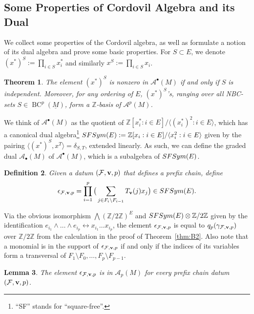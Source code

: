 \documentclass{amsart}
\newtheorem{theorem}{Theorem}[section]
\newtheorem{lemma}[theorem]{Lemma}
\newtheorem{definition}[theorem]{Definition}
\newcommand\Acal{{\mathcal A}}
\newcommand\Fcal{{\mathcal F}}
\newcommand\vv{{\bf v}}
\newcommand\ZZ{{\mathbb Z}}
\newcommand\Ztwo{{\mathbb Z}/2{\mathbb Z}}
\newcommand\qbv{{q}}
\DeclareMathOperator{\BC}{BC}
\begin{document}
{\subsection{Some Properties of Cordovil Algebra and its Dual} \label{sec:Cordovil}

We collect some properties of the Cordovil algebra, as well as formulate a notion of its dual algebra and prove some basic properties. For $S\subset E$, we denote $(x^*)^S:=\prod_{i\in S} x^*_i$ and similarly $x^S:=\prod_{i\in S} x_i$.

\begin{theorem} \cite[Corollary~2.5 and Corollary~2.8]{Cord02}
The element $(x^*)^S$ is nonzero in $\Acal^\bullet(M)$ if and only if $S$ is independent. Moreover, for any ordering of $E$, $(x^*)^S$'s, ranging over all NBC-sets $S\in\BC^p(\underline{M})$, form a $\ZZ$-basis of $\Acal^p(M)$. 
\end{theorem}

We think of $\Acal^\bullet(M)$ as the quotient of $\mathbb{Z}[x_i^*:i\in E]/\langle (x^*_i)^2: i\in E\rangle$, which has a canonical dual algebra\footnote{``SF'' stands for ``square-free''.} ${\rm SFSym}(E):=\mathbb{Z}[x_i:i\in E]/\langle x_i^2: i\in E\rangle$ given by the pairing $\langle(x^*)^S, x^T\rangle=\delta_{S,T}$, extended linearly. As such, we can define the graded dual $\Acal_\bullet(M)$ of $\Acal^\bullet(M)$, which is a subalgebra of ${\rm SFSym}(E)$.

\begin{definition}
    Given a datum $(\Fcal,\vv,p)$ that defines a prefix chain, define
    $$\epsilon_{\Fcal,\vv,p}=\prod_{i=1}^p\big(\sum_{j\in F_i\setminus F_{i-1}} T_\vv(j)x_j\big) \in {\rm SFSym}(E).$$
\end{definition}

Via the obvious isomorphism $\bigwedge(\Ztwo)^E$ and ${\rm SFSym}(E)\otimes\Ztwo$ given by the identification $e_{i_1}\wedge\ldots\wedge e_{i_p}\leftrightarrow x_{i_1}\ldots x_{i_p}$, the element $\epsilon_{\Fcal,\vv,p}$ is equal to $\qbv_p(\gamma_{\Fcal,\vv,p})$ over $\Ztwo$ from the calculation in the proof of Theorem~\ref{thm:B2}. Also note that a monomial is in the support of $\epsilon_{\Fcal,\vv,p}$ if and only if the indices of its variables form a transversal of $F_1\setminus F_0,\ldots, F_p\setminus F_{p-1}$.

\begin{lemma}
    The element $\epsilon_{\Fcal,\vv,p}$ is in $\Acal_p(M)$ for every prefix chain datum $(\Fcal,\vv,p)$.
\end{lemma}

}
\end{document}
